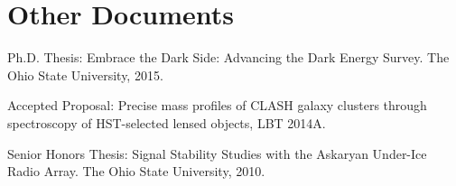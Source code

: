 \documentclass[12pt,a4paper,sans]{moderncv}	%
\begin{document}

\section{Other Documents}
\begin{achievements}
\item Ph.D. Thesis: Embrace the Dark Side: Advancing the Dark Energy Survey. The Ohio State University, 2015.
\item Accepted Proposal: Precise mass profiles of CLASH galaxy clusters through spectroscopy of HST-selected lensed objects, LBT 2014A.
\item Senior Honors Thesis: Signal Stability Studies with the Askaryan Under-Ice Radio Array. The Ohio State University, 2010.
\end{achievements}



%

\end{document}

